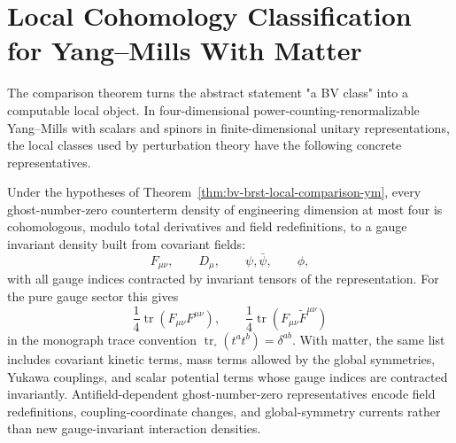 \section{Local Cohomology Classification for Yang--Mills With Matter}
\label{sec:bv-local-cohomology-ym}

The comparison theorem turns the abstract statement "a BV class" into a
computable local object.  In four-dimensional power-counting-renormalizable
Yang--Mills with scalars and spinors in finite-dimensional unitary
representations, the local classes used by perturbation theory have the
following concrete representatives.

\begin{proposition}
\label{prop:bv-renormalizable-ghost-zero-cohomology}
Under the hypotheses of Theorem~\ref{thm:bv-brst-local-comparison-ym}, every
ghost-number-zero counterterm density of engineering dimension at most four is
cohomologous, modulo total derivatives and field redefinitions, to a gauge
invariant density built from covariant fields:
\[
  F_{\mu\nu},\qquad
  D_\mu,\qquad
  \psi,\bar\psi,\qquad
  \phi ,
\]
with all gauge indices contracted by invariant tensors of the representation.
For the pure gauge sector this gives
\[
  \frac1{4}\operatorname{tr}(F_{\mu\nu}F^{\mu\nu}),
  \qquad
  \frac1{4}\operatorname{tr}(F_{\mu\nu}\widetilde F^{\mu\nu})
\]
in the monograph trace convention
\(\operatorname{tr}_{\square}(t^at^b)=\delta^{ab}\).  With matter, the same
list includes covariant kinetic terms, mass terms allowed by the global
symmetries, Yukawa couplings, and scalar potential terms whose gauge indices
are contracted invariantly.  Antifield-dependent ghost-number-zero
representatives encode field redefinitions, coupling-coordinate changes, and
global-symmetry currents rather than new gauge-invariant interaction
densities.
\end{proposition}

